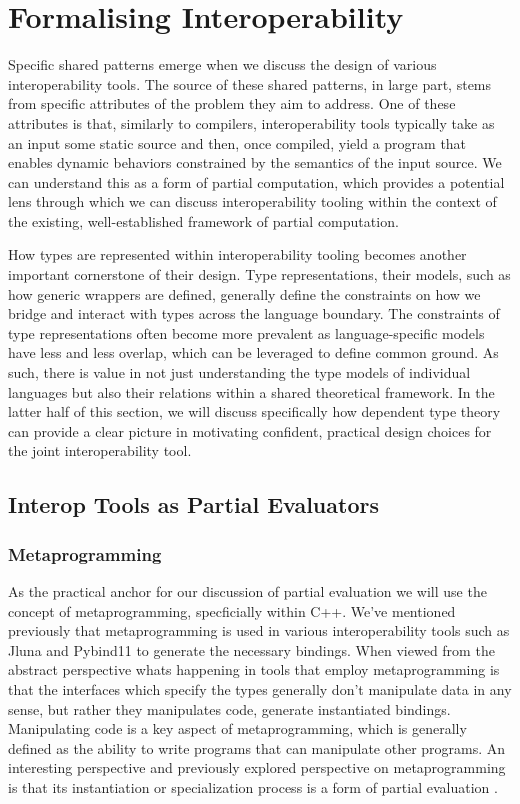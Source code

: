 \section{Formalising Interoperability}\label{s:record_type}

Specific shared patterns emerge when we discuss the design of various interoperability tools. The source of these shared patterns, in large part, stems from specific attributes of the problem they aim to address. One of these attributes is that, similarly to compilers, interoperability tools typically take as an input some static source and then, once compiled, yield a program that enables dynamic behaviors constrained by the semantics of the input source. We can understand this as a form of partial computation, which provides a potential lens through which we can discuss interoperability tooling within the context of the existing, well-established framework of partial computation.

How types are represented within interoperability tooling becomes another important cornerstone of their design. Type representations, \ie their models, such as how generic wrappers are defined, generally define the constraints on how we bridge and interact with types across the language boundary. The constraints of type representations often become more prevalent as language-specific models have less and less overlap, which can be leveraged to define common ground. As such, there is value in not just understanding the type models of individual languages but also their relations within a shared theoretical framework. In the latter half of this section, we will discuss specifically how dependent type theory can provide a clear picture in motivating confident, practical design choices for the joint interoperability tool.   

\subsection{Interop Tools as Partial Evaluators}\label{s:interoperability_tools}

\subsubsection{Metaprogramming}

As the practical anchor for our discussion of partial evaluation we will use the concept of metaprogramming, specficially within C++. We've mentioned previously that metaprogramming is used in various interoperability tools such as Jluna and Pybind11 to generate the necessary bindings. When viewed from the abstract perspective whats happening in tools that employ metaprogramming is that the interfaces which specify the types generally don't manipulate data in any sense, but rather they manipulates code,  \ie generate instantiated bindings. Manipulating code is a key aspect of metaprogramming, which is generally defined as the ability to write programs that can manipulate other programs. An interesting perspective and previously explored perspective on metaprogramming is that its instantiation or specialization process is a form of partial evaluation \cite{Veldhuizen1998}. 

